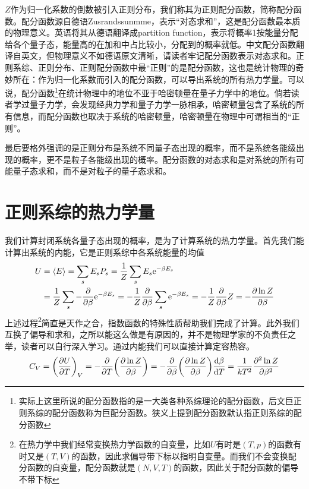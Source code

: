 \documentclass[../../main.tex]{subfiles}
\begin{document}
\(Z\)作为归一化系数的倒数被引入正则分布，我们称其为正则配分函数，简称配分函数。配分函数源自德语Zusrandssunmme，表示“对态求和”，这是配分函数最本质的物理意义。英语将其从德语翻译成partition function，表示将概率1按能量分配给各个量子态，能量高的在加和中占比较小，分配到的概率就低。中文配分函数翻译自英文，但物理意义不如德语原文清晰，请读者牢记配分函数表示对态求和。正则系综、正则分布、正则配分函数中最“正则”的是配分函数，这也是统计物理的奇妙所在：作为归一化系数而引入的配分函数，可以导出系统的所有热力学量。可以说，配分函数\footnote{实际上这里所说的配分函数指的是一大类各种系综理论的配分函数，后文巨正则系综的配分函数称为巨配分函数。狭义上提到配分函数默认指正则系综的配分函数}在统计物理中的地位不亚于哈密顿量在量子力学中的地位。倘若读者学过量子力学，会发现经典力学和量子力学一脉相承，哈密顿量包含了系统的所有信息，而配分函数也取决于系统的哈密顿量，哈密顿量在物理中可谓相当的“正则”。

最后要格外强调的是正则分布是系统不同量子态出现的概率，而不是系统各能级出现的概率，更不是粒子各能级出现的概率。配分函数的对态求和是对系统的所有可能量子态求和，而不是对粒子的量子态求和。

\section{正则系综的热力学量}

我们计算封闭系统各量子态出现的概率，是为了计算系统的热力学量。首先我们能计算出系统的内能，它是正则系综中各系统能量的均值
\begin{equation}
    \begin{split}
        U&=\expval{E}=\sum_s E_sP_s=\frac{1}{Z}\sum_s E_s\mathrm{e}^{-\beta E_s} \\
        &=\frac{1}{Z}\sum_s -\pdv{\beta}\mathrm{e}^{-\beta E_s}=-\frac{1}{Z}\pdv{\beta}\sum_s \mathrm{e}^{-\beta E_s}=-\frac{1}{Z}\pdv{\beta}Z=-\pdv{\ln Z}{\beta}
    \end{split}
\end{equation}
上述过程\footnote{在热力学中我们经常变换热力学函数的自变量，比如\(U\)有时是\((T,p)\)的函数有时又是\((T,V)\)的函数，因此求偏导带下标以指明自变量。而我们不会变换配分函数的自变量，配分函数就是\((N,V,T)\)的函数，因此关于配分函数的偏导不带下标}简直是天作之合，指数函数的特殊性质帮助我们完成了计算。此外我们互换了偏导和求和，之所以能这么做是有原因的，并不是物理学家的不负责任之举，读者可以自行深入学习。通过内能我们可以直接计算定容热容。
\begin{equation}
    C_V=\left(\pdv{U}{T}\right)_{V}=-\pdv{T}(\pdv{\ln Z}{\beta})=-\pdv{\beta}(\pdv{\ln Z}{\beta})\dv{\beta}{T}=\frac{1}{kT^2}\pdv[2]{\ln Z}{\beta}
\end{equation}
\end{document}
